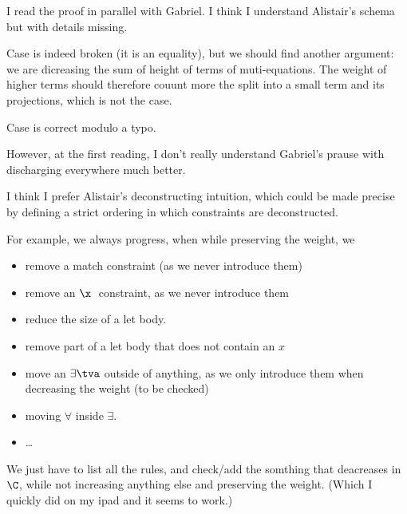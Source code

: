 \documentclass[acmsmall,screen,nonacm,review]{acmart}
\begin{document}
\begin{version}{\color{blue}\True}
I read the proof in parallel with Gabriel.
I think I understand Alistair's schema but with details missing.

Case  is indeed broken (it is an equality), but we should find
another argument: we are dicreasing the sum of height of terms of
muti-equations. The weight of higher terms should therefore couunt more
the split into a small term and its projections, which is not the case.

Case  is correct modulo a typo.

However, at the first reading, I don't really understand Gabriel's prause
with discharging everywhere much better.

I think I prefer Alistair's deconstructing intuition, which could be made
precise by defining a strict ordering in which constraints are
deconstructed.

For example, we always progress, when while preserving the weight,
we
\begin{itemize}

\item remove a match constraint (as we never introduce them)
\item remove an $\x\;\t$ constraint, as we never introduce them
\item reduce the size of a let body.
\item remove part of a let body that does not contain an $x$
\item move an $\exists \tv$ outside of anything, as
      we only introduce them when decreasing the weight (to be checked)
\item moving $\forall$ inside $\exists$.
\item \ldots
\end{itemize}
We just have to list all the rules, and check/add the somthing
that deacreases in $\C$, while not increasing anything else
and preserving the weight. (Which I quickly did on
my ipad and it seems to work.)
\end{version}
\end{document}
